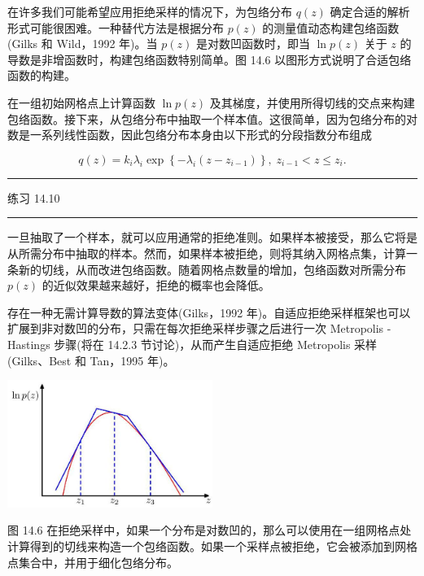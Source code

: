 \documentclass[10pt]{article}
\newcommand{\HRule}{\begin{center}\rule{0.9\linewidth}{0.2mm}\end{center}}
\begin{document}
在许多我们可能希望应用拒绝采样的情况下，为包络分布 \(q\left( z\right)\) 确定合适的解析形式可能很困难。一种替代方法是根据分布 \(p\left( z\right)\) 的测量值动态构建包络函数(Gilks 和 Wild，1992 年)。当 \(p\left( z\right)\) 是对数凹函数时，即当 \(\ln p\left( z\right)\) 关于 \(z\) 的导数是非增函数时，构建包络函数特别简单。图 14.6 以图形方式说明了合适包络函数的构建。

在一组初始网格点上计算函数 \(\ln p\left( z\right)\) 及其梯度，并使用所得切线的交点来构建包络函数。接下来，从包络分布中抽取一个样本值。这很简单，因为包络分布的对数是一系列线性函数，因此包络分布本身由以下形式的分段指数分布组成

\[
q\left( z\right)  = {k}_{i}{\lambda }_{i}\exp \left\{  {-{\lambda }_{i}\left( {z - {z}_{i - 1}}\right) }\right\}  ,\;{z}_{i - 1} < z \leq  {z}_{i}. \tag{14.17}
\]

\HRule

练习 14.10

\HRule

一旦抽取了一个样本，就可以应用通常的拒绝准则。如果样本被接受，那么它将是从所需分布中抽取的样本。然而，如果样本被拒绝，则将其纳入网格点集，计算一条新的切线，从而改进包络函数。随着网格点数量的增加，包络函数对所需分布 \(p\left( z\right)\) 的近似效果越来越好，拒绝的概率也会降低。

存在一种无需计算导数的算法变体(Gilks，1992 年)。自适应拒绝采样框架也可以扩展到非对数凹的分布，只需在每次拒绝采样步骤之后进行一次 Metropolis - Hastings 步骤(将在 14.2.3 节讨论)，从而产生自适应拒绝 Metropolis 采样(Gilks、Best 和 Tan，1995 年)。

\begin{center}
\includegraphics[max width=0.5\textwidth]{images/0194e279-9b28-703a-88f4-c3ac21e2010d_455_916_344_635_395_0.jpg}
\end{center}
\hspace*{3em} 

图 14.6 在拒绝采样中，如果一个分布是对数凹的，那么可以使用在一组网格点处计算得到的切线来构造一个包络函数。如果一个采样点被拒绝，它会被添加到网格点集合中，并用于细化包络分布。
\end{document}
